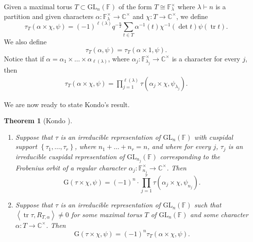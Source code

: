 \documentclass[12pt, reqno]{amsart}
\newtheorem{theorem}{Theorem}[section]
\theoremstyle{definition}
\theoremstyle{definition}
\theoremstyle{definition}
\newcommand{\cComplex}{\mathbb{C}}
\newcommand{\multiplicativegroup}[1]{#1^{\times}}
\newcommand{\lengthof}{\ell}
\newcommand{\innerproduct}[2]{\left\langle #1,#2\right\rangle}
\newcommand{\fieldCharacter}{\psi}
\newcommand{\trace}{\operatorname{tr}}
\newcommand{\GL}{\mathrm{GL}}
\newcommand{\finiteField}{\mathbb{F}}
\newcommand{\finiteFieldExtension}[1]{\finiteField_{#1}}
\newcommand{\GaussSumSingleTorusCharacter}[3]{\tau_{#1}\left(#2, #3\right)}
\newcommand{\GaussSumScalar}[2]{\mathrm{G}\left(#1, #2\right)}
\newcommand{\GaussSumCharacter}[3]{\tau\left(#1 \times #2, #3\right)}
\newcommand{\GaussSumTorusCharacter}[4]{\tau_{#1}\left(#2 \times #3, #4\right)}
\newcommand{\RTTheta}[2]{R_{#1, #2}}
\begin{document}
Given a maximal torus $T \subset \GL_n\left(\finiteField\right)$ of the form $T \cong \multiplicativegroup{\finiteFieldExtension{\lambda}}$ where $\lambda \vdash n$ is a partition and given characters $\alpha \colon \multiplicativegroup{\finiteFieldExtension{\lambda}} \to \multiplicativegroup{\cComplex}$ and $\chi \colon T \to \multiplicativegroup{\cComplex}$, we define $$\GaussSumTorusCharacter{T}{\alpha}{\chi}{\fieldCharacter} = \left(-1\right)^{\lengthof\left(\lambda\right)} q^{-\frac{n}{2}} \sum_{t \in T} \alpha^{-1}\left(t\right) \chi^{-1}\left(\det t\right) \fieldCharacter\left(\trace t\right).$$
We also define $$\GaussSumSingleTorusCharacter{T}{\alpha}{\fieldCharacter} = \GaussSumTorusCharacter{T}{\alpha}{1}{\fieldCharacter}.$$
Notice that if $\alpha = \alpha_1 \times \dots \times \alpha_{\lengthof\left(\lambda\right)}$, where $\alpha_j \colon \multiplicativegroup{\finiteFieldExtension{\lambda_j}} \to \multiplicativegroup{\cComplex}$ is a character for every $j$, then
\begin{align}
	\label{eq:Gauss_multiplicitive}
	\GaussSumTorusCharacter{T}{\alpha}{\chi}{\fieldCharacter} = \prod_{j=1}^{\lengthof\left(\lambda\right)} \GaussSumCharacter{\alpha_j}{\chi}{\fieldCharacter_{\lambda_j}}.
\end{align}

We are now ready to state Kondo's result.
\begin{theorem}[Kondo {\cite{Kondo1963}}]\label{thm:KondoClassical}
	\begin{enumerate}
		\item Suppose that $\tau$ is an irreducible representation of $\GL_n\left(\finiteField\right)$ with cuspidal support $\left\{\tau_1,\dots, \tau_r\right\}$, where $n_1 + \dots + n_r = n$, and where for every $j$, $\tau_j$ is an irreducible cuspidal representation of $\GL_{n_j}\left(\finiteField\right)$ corresponding to the Frobenius orbit of a regular character $\alpha_j \colon \multiplicativegroup{\finiteFieldExtension{n_j}} \to \multiplicativegroup{\cComplex}$. Then
		$$\GaussSumScalar{\tau \times \chi}{\fieldCharacter} = \left(-1\right)^n \cdot \prod_{j=1}^r \GaussSumCharacter{\alpha_j}{\chi}{\fieldCharacter_{n_j}}.$$
		\item Suppose that $\tau$ is an irreducible representation of $\GL_n\left(\finiteField\right)$ such that $\innerproduct{\trace \tau}{\RTTheta{T}{\alpha}} \ne 0$ for some maximal torus $T$ of $\GL_n\left(\finiteField\right)$ and some character $\alpha \colon T \to \multiplicativegroup{\cComplex}$. Then $$\GaussSumScalar{\tau \times \chi}{\fieldCharacter} = \left(-1\right)^n \GaussSumTorusCharacter{T}{\alpha}{\chi}{\fieldCharacter}.$$
	\end{enumerate}
\end{theorem}
\end{document}

